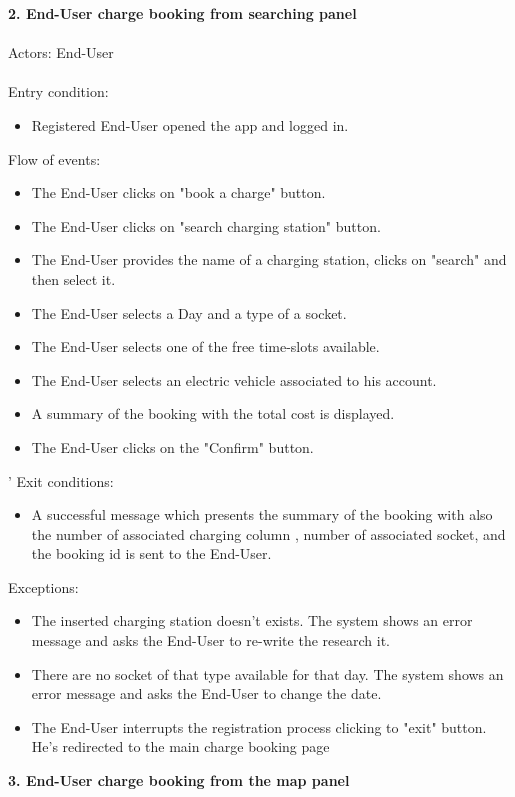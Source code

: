 \documentclass[a4paper]{report}
\begin{document}
\textbf{2. End-User charge booking from searching panel}\label{uc:3}
\\
\\
Actors: End-User \\ \\
Entry condition:
\begin{itemize}
\item Registered End-User opened the app and logged in.
\end{itemize}
Flow of events:
\begin{itemize}
\item The End-User clicks on "book a charge" button.
\item The End-User clicks on "search charging station" button.
\item The End-User provides the name of a charging station, clicks on "search" and then select it.
\item The End-User selects a Day and a type of a socket.
\item The End-User selects one of the free time-slots available.
\item The End-User selects an electric vehicle associated to his account.
\item A summary of the booking with the total cost is displayed.
\item The End-User clicks on the "Confirm" button.
\end{itemize}'                                                                     
Exit conditions:
\begin{itemize}
\item A successful message which presents the summary of the booking with also the number of associated charging column , number of associated socket, and the booking id is sent to the End-User.
 \end{itemize}
Exceptions: 
 \begin{itemize}
 \item The inserted charging station doesn't exists. The system shows an error message and asks the End-User to re-write the research it.
 \item There are no socket of that type available for that day. The system shows an error message and asks the End-User to change the date.
 \item The End-User interrupts the registration process clicking to "exit" button. He's redirected to the main charge booking page
\end{itemize}
\textbf{3. End-User charge booking from the map panel}\label{uc:4}
\end{document}

